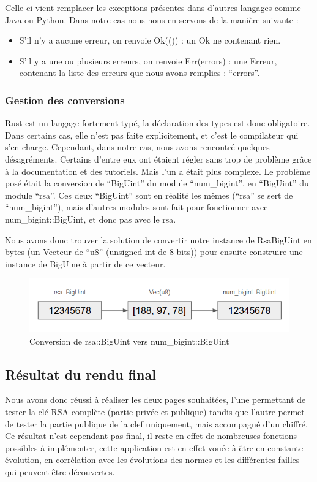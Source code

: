 \documentclass[12pt]{article} %
\begin{document}
		Celle-ci vient remplacer les exceptions présentes dans d’autres langages comme Java ou Python. Dans notre cas nous nous en servons de la manière suivante :
		
		\begin{itemize}
			\item S’il n’y a aucune erreur, on renvoie Ok(()) : un Ok ne contenant rien.
			\item S’il y a une ou plusieurs erreurs, on renvoie Err(errors) : une Erreur, contenant la liste des erreurs que nous avons remplies : “errors”.
		\end{itemize}
		
		
		\subsubsection{Gestion des conversions}

		Rust est un langage fortement typé, la déclaration des types est donc obligatoire. Dans certains cas, elle n’est pas faite explicitement, et c’est le compilateur qui s’en charge. Cependant, dans notre cas, nous avons rencontré quelques désagréments. Certains d’entre eux ont étaient régler sans trop de problème grâce à la documentation et des tutoriels. Mais l’un a était plus complexe. Le problème posé était la conversion de “BigUint” du module “num\_bigint”, en “BigUint” du module “rsa”. Ces deux “BigUint” sont en réalité les mêmes (“rsa” se sert de “num\_bigint”), mais d’autres modules sont fait pour fonctionner avec num\_bigint::BigUint, et donc pas avec le rsa. 
		
Nous avons donc trouver la solution de convertir notre instance de RsaBigUint en bytes (un Vecteur de “u8” (unsigned int de 8 bits)) pour ensuite construire une instance de BigUine à partir de ce vecteur.
	
	
	\begin{figure}[!h]
		\begin{center}
			\includegraphics[scale=0.5]{images/conversionBigUint}
			\caption{Conversion de rsa::BigUint vers num\_bigint::BigUint}
		\end{center}
	\end{figure}
	
	\subsection{Résultat du rendu final}
	Nous avons donc réussi à réaliser les deux pages souhaitées, l’une permettant de tester la clé RSA complète (partie privée et publique) tandis que l’autre permet de tester la partie publique de la clef uniquement, mais accompagné d’un chiffré. Ce résultat n’est cependant pas final, il reste en effet de nombreuses fonctions possibles à implémenter, cette application est en effet vouée à être en constante évolution, en corrélation avec les évolutions des normes et les différentes failles qui peuvent être découvertes.
	
\end{document}
